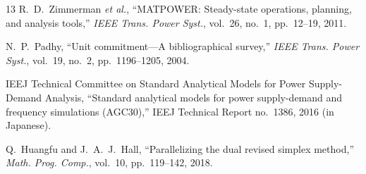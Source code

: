 \documentclass[journal]{IEEEtran}
\begin{document}
\begin{thebibliography}{13}
R.~D.~Zimmerman \textit{et al.}, ``MATPOWER: Steady-state operations, planning, and analysis tools,'' \textit{IEEE Trans. Power Syst.}, vol.~26, no.~1, pp.~12--19, 2011.

N.~P.~Padhy, ``Unit commitment---A bibliographical survey,'' \textit{IEEE Trans. Power Syst.}, vol.~19, no.~2, pp.~1196--1205, 2004.

IEEJ Technical Committee on Standard Analytical Models for Power Supply-Demand Analysis, ``Standard analytical models for power supply-demand and frequency simulations (AGC30),'' IEEJ Technical Report no.~1386, 2016 (in Japanese).

Q.~Huangfu and J.~A.~J.~Hall, ``Parallelizing the dual revised simplex method,'' \textit{Math. Prog. Comp.}, vol.~10, pp.~119--142, 2018.

\end{thebibliography}
\end{document}
